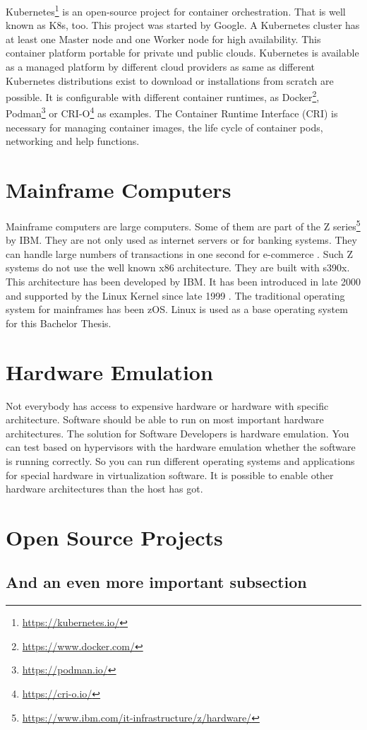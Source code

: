 Kubernetes\footnote{\url{https://kubernetes.io/}} is an open-source project for container orchestration. That is well known as K8s, too. This project was started by Google. A Kubernetes cluster has at least one Master node and one Worker node for high availability. This container platform portable for private und public clouds. Kubernetes is available as a managed platform by different cloud providers as same as different Kubernetes distributions exist to download or installations from scratch are possible. It is configurable with different container runtimes, as Docker\footnote{\url{https://www.docker.com/}}, Podman\footnote{\url{https://podman.io/}} or CRI-O\footnote{\url{https://cri-o.io/}} as examples. The Container Runtime Interface (CRI) is necessary for managing container images, the life cycle of container pods, networking and help functions\cite[~p.16]{Scholl2019}. 
\blindtext

\section{Mainframe Computers}

Mainframe computers are large computers. Some of them are part of the Z series\footnote{\url{https://www.ibm.com/it-infrastructure/z/hardware/}} by IBM. They are not only used as internet servers or for banking systems. They can handle large numbers of transactions in one second for e-commerce \cite[~p.56]{Tanenbaum2014}. Such Z systems do not use the well known x86 architecture. They are built with s390x. This architecture has been developed by IBM. It has been introduced in late 2000 and supported by the Linux Kernel since late 1999 \cite[~p.15]{Block2019}. The traditional operating system for mainframes has been z\/OS. Linux is used as a base operating system for this Bachelor Thesis.


\blindtext

\section{Hardware Emulation}

Not everybody has access to expensive hardware or hardware with  specific architecture. Software should be able to run on most important hardware architectures. The solution for Software Developers is hardware emulation. You can test based on hypervisors with the hardware emulation whether the software is running correctly. So you can run different operating systems and applications for special hardware in virtualization software. It is possible to enable other hardware architectures than the host has got.
\blindtext

\section{Open Source Projects}
\blindtext

\subsection{And an even more important subsection}
\blindtext
